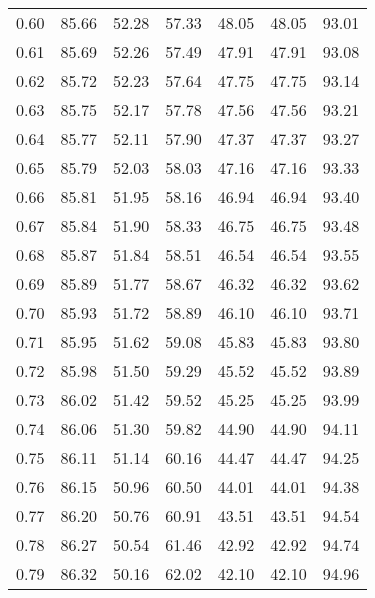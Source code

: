 \begin{tabular}{|c|c|c|c|c|c|c|}
      0.60 &     85.66 &     52.28 &      57.33 &   48.05 &      48.05 &         93.01 \\
      0.61 &     85.69 &     52.26 &      57.49 &   47.91 &      47.91 &         93.08 \\
      0.62 &     85.72 &     52.23 &      57.64 &   47.75 &      47.75 &         93.14 \\
      0.63 &     85.75 &     52.17 &      57.78 &   47.56 &      47.56 &         93.21 \\
      0.64 &     85.77 &     52.11 &      57.90 &   47.37 &      47.37 &         93.27 \\
      0.65 &     85.79 &     52.03 &      58.03 &   47.16 &      47.16 &         93.33 \\
      0.66 &     85.81 &     51.95 &      58.16 &   46.94 &      46.94 &         93.40 \\
      0.67 &     85.84 &     51.90 &      58.33 &   46.75 &      46.75 &         93.48 \\
      0.68 &     85.87 &     51.84 &      58.51 &   46.54 &      46.54 &         93.55 \\
      0.69 &     85.89 &     51.77 &      58.67 &   46.32 &      46.32 &         93.62 \\
      0.70 &     85.93 &     51.72 &      58.89 &   46.10 &      46.10 &         93.71 \\
      0.71 &     85.95 &     51.62 &      59.08 &   45.83 &      45.83 &         93.80 \\
      0.72 &     85.98 &     51.50 &      59.29 &   45.52 &      45.52 &         93.89 \\
      0.73 &     86.02 &     51.42 &      59.52 &   45.25 &      45.25 &         93.99 \\
      0.74 &     86.06 &     51.30 &      59.82 &   44.90 &      44.90 &         94.11 \\
      0.75 &     86.11 &     51.14 &      60.16 &   44.47 &      44.47 &         94.25 \\
      0.76 &     86.15 &     50.96 &      60.50 &   44.01 &      44.01 &         94.38 \\
      0.77 &     86.20 &     50.76 &      60.91 &   43.51 &      43.51 &         94.54 \\
      0.78 &     86.27 &     50.54 &      61.46 &   42.92 &      42.92 &         94.74 \\
      0.79 &     86.32 &     50.16 &      62.02 &   42.10 &      42.10 &         94.96 \\

\end{tabular}
